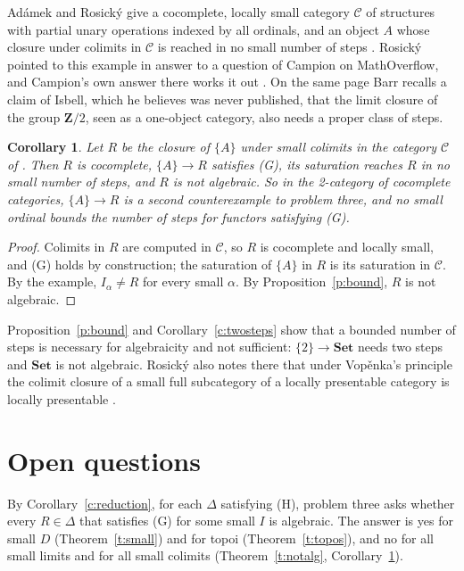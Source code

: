 \documentclass[11pt,a4paper]{amsart}
\newtheorem{corollary}[theorem]{Corollary}
\theoremstyle{definition}
\theoremstyle{remark}
\newcommand{\Set}{\mathbf{Set}}
\begin{document}
Adámek and Rosický give a cocomplete, locally small category $\mathcal C$ of structures with partial unary operations indexed by all ordinals, and an object $A$ whose closure under colimits in $\mathcal C$ is reached in no small number of steps \cite[Example~6.38]{ar}. Rosický pointed to this example in answer to a question of Campion on MathOverflow, and Campion's own answer there works it out \cite{mo}. On the same page Barr recalls a claim of Isbell, which he believes was never published, that the limit closure of the group $\mathbf Z/2$, seen as a one-object category, also needs a proper class of steps.

\begin{corollary}\label{c:ar}
Let $R$ be the closure of $\{A\}$ under small colimits in the category $\mathcal C$ of \cite[Example~6.38]{ar}. Then $R$ is cocomplete, $\{A\}\to R$ satisfies (G), its saturation reaches $R$ in no small number of steps, and $R$ is not algebraic. So in the 2-category of cocomplete categories, $\{A\}\to R$ is a second counterexample to problem three, and no small ordinal bounds the number of steps for functors satisfying (G).
\end{corollary}

\begin{proof}
Colimits in $R$ are computed in $\mathcal C$, so $R$ is cocomplete and locally small, and (G) holds by construction; the saturation of $\{A\}$ in $R$ is its saturation in $\mathcal C$. By the example, $I_\alpha\neq R$ for every small $\alpha$. By Proposition~\ref{p:bound}, $R$ is not algebraic.
\end{proof}

Proposition~\ref{p:bound} and Corollary~\ref{c:twosteps} show that a bounded number of steps is necessary for algebraicity and not sufficient: $\{2\}\to\Set$ needs two steps and $\Set$ is not algebraic. Rosický also notes there that under Vop\v{e}nka's principle the colimit closure of a small full subcategory of a locally presentable category is locally presentable \cite{mo}.

\section{Open questions}\label{sec:open}

By Corollary~\ref{c:reduction}, for each $\Delta$ satisfying (H), problem three asks whether every $R\in\Delta$ that satisfies (G) for some small $I$ is algebraic. The answer is yes for small $D$ (Theorem~\ref{t:small}) and for topoi (Theorem~\ref{t:topos}), and no for all small limits and for all small colimits (Theorem~\ref{t:notalg}, Corollary~\ref{c:ar}).
\end{document}
